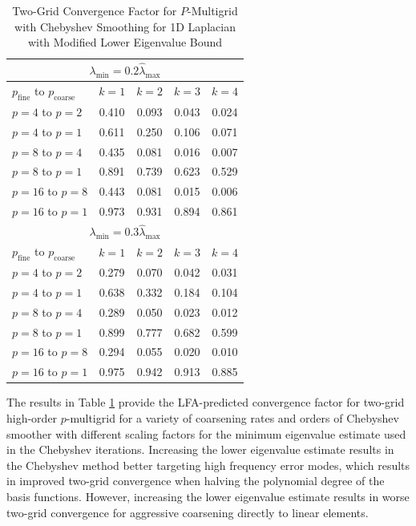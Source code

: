 \begin{table}[ht!]
\begin{center}
\begin{tabular}{l c c c c}
  \toprule
  \multicolumn{5}{c}{$\lambda_{\min} = 0.2 \hat{\lambda}_{\max}$} \\
  \toprule
  $p_{\text{fine}}$ to $p_{\text{coarse}}$  &  $k = 1$   &  $k = 2$   &  $k = 3$   &  $k = 4$   \\
  \toprule
  $p = 4$ to $p = 2$   &  0.410  &  0.093  &  0.043  &  0.024  \\
  $p = 4$ to $p = 1$   &  0.611  &  0.250  &  0.106  &  0.071  \\
  \midrule
  $p = 8$ to $p = 4$   &  0.435  &  0.081  &  0.016  &  0.007  \\
  $p = 8$ to $p = 1$   &  0.891  &  0.739  &  0.623  &  0.529  \\
  \midrule
  $p = 16$ to $p = 8$  &  0.443  &  0.081  &  0.015  &  0.006  \\
  $p = 16$ to $p = 1$  &  0.973  &  0.931  &  0.894  &  0.861  \\
  \toprule
  \multicolumn{5}{c}{$\lambda_{\min} = 0.3 \hat{\lambda}_{\max}$} \\
  \toprule
  $p_{\text{fine}}$ to $p_{\text{coarse}}$  &  $k = 1$   &  $k = 2$   &  $k = 3$   &  $k = 4$   \\
  \toprule
  $p = 4$ to $p = 2$   &  0.279  &  0.070  &  0.042  &  0.031  \\
  $p = 4$ to $p = 1$   &  0.638  &  0.332  &  0.184  &  0.104  \\
  \midrule
  $p = 8$ to $p = 4$   &  0.289  &  0.050  &  0.023  &  0.012  \\
  $p = 8$ to $p = 1$   &  0.899  &  0.777  &  0.682  &  0.599  \\
  \midrule
  $p = 16$ to $p = 8$  &  0.294  &  0.055  &  0.020  &  0.010  \\
  $p = 16$ to $p = 1$  &  0.975  &  0.942  &  0.913  &  0.885  \\
  \bottomrule
\end{tabular}
\end{center}
\caption{Two-Grid Convergence Factor for $P$-Multigrid with Chebyshev Smoothing for 1D Laplacian with Modified Lower Eigenvalue Bound}
\label{table:two_grid_1d_chebyshev_eigenvalues}
\end{table}

The results in Table \ref{table:two_grid_1d_chebyshev_eigenvalues} provide the LFA-predicted convergence factor for two-grid high-order $p$-multigrid for a variety of coarsening rates and orders of Chebyshev smoother with different scaling factors for the minimum eigenvalue estimate used in the Chebyshev iterations.
Increasing the lower eigenvalue estimate results in the Chebyshev method better targeting high frequency error modes, which results in improved two-grid convergence when halving the polynomial degree of the basis functions.
However, increasing the lower eigenvalue estimate results in worse two-grid convergence for aggressive coarsening directly to linear elements.

